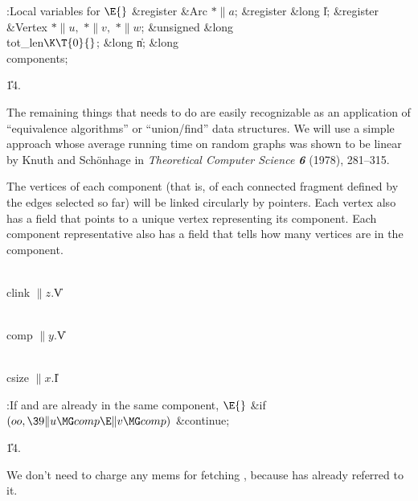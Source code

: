 \Y\B\4:Local variables for \X${}\E{}$\6
\&{register} \&{Arc} ${}{*}\|a{}$;\6
\&{register} \&{long} \|l;\6
\&{register} \&{Vertex} ${}{*}\|u,{}$ ${}{*}\|v,{}$ ${}{*}\|w{}$;\6
\&{unsigned} \&{long} \\{tot\_len}${}\K\T{0}{}$;\6
\&{long} \|n;\6
\&{long} \\{components};\par
\U14.\fi

The remaining things that  needs to do are easily
recognizable
as an application of ``equivalence algorithms'' or ``union/find''
data structures. We will use a simple approach whose average running
time on random graphs was shown to be linear by Knuth and Sch\"onhage
in {\sl Theoretical Computer Science\/ \bf 6} (1978), 281--315.

The vertices of each component (that is, of each connected fragment defined by
the edges selected so far) will be linked circularly by 
pointers.
Each vertex also has a  field that points to a unique vertex
representing its component. Each component representative also has
a  field that tells how many vertices are in the component.

\Y\B\4\D\\{clink}\5
$\|z.{}$\|V\par
\B\4\D\\{comp}\5
$\|y.{}$\|V\par
\B\4\D\\{csize}\5
$\|x.{}$\|I\par
\Y\B\4:If  and  are already in the same component, \X${}\E{}$\6
\&{if} ${}(\\{oo},\39\|u\MG\\{comp}\E\|v\MG\\{comp}){}$\1\5
\&{continue};\2\par
\U14.\fi

We don't need to charge any mems for fetching ,
because
 has already referred to it.

